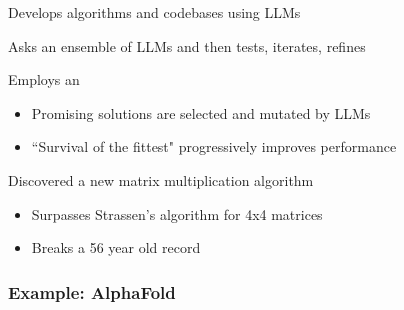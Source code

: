 \begin{frame}
    
    Develops algorithms and codebases using LLMs

    \vspace{0.5em}
    Asks an ensemble of LLMs and then tests, iterates, refines

    \vspace{0.5em}
    \vspace{0.5em}
    \vspace{0.5em}
    Employs an 

    \vspace{0.5em}
    \begin{itemize}
        \item Promising solutions are selected and mutated by LLMs 
        \vspace{0.5em}
        \item ``Survival of the fittest" progressively improves performance
    \end{itemize}

        \vspace{0.5em}
        \vspace{0.5em}
    Discovered a new matrix multiplication algorithm

    \begin{itemize}
        \item Surpasses Strassen's algorithm for 4x4 matrices
        \vspace{0.5em}
        \item Breaks a 56 year old record
    \end{itemize}

\end{frame}


\begin{frame}\frametitle{Example: AlphaFold}
    
    \begin{figure}
       \centering
    \end{figure}

\end{frame}

